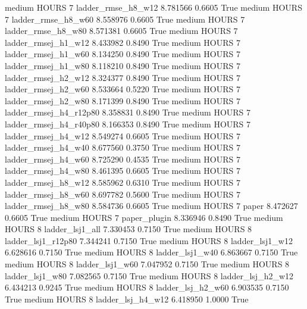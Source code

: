     medium    HOURS                 7     ladder_rmse_h8_w12   8.781566      0.6605    True
    medium    HOURS                 7     ladder_rmse_h8_w60   8.558976      0.6605    True
    medium    HOURS                 7     ladder_rmse_h8_w80   8.571381      0.6605    True
    medium    HOURS                 7    ladder_rmsej_h1_w12   8.433982      0.8490    True
    medium    HOURS                 7    ladder_rmsej_h1_w60   8.134250      0.8490    True
    medium    HOURS                 7    ladder_rmsej_h1_w80   8.118210      0.8490    True
    medium    HOURS                 7    ladder_rmsej_h2_w12   8.324377      0.8490    True
    medium    HOURS                 7    ladder_rmsej_h2_w60   8.533664      0.5220    True
    medium    HOURS                 7    ladder_rmsej_h2_w80   8.171399      0.8490    True
    medium    HOURS                 7 ladder_rmsej_h4_r12p80   8.358831      0.8490    True
    medium    HOURS                 7 ladder_rmsej_h4_r40p80   8.166353      0.8490    True
    medium    HOURS                 7    ladder_rmsej_h4_w12   8.549274      0.6605    True
    medium    HOURS                 7    ladder_rmsej_h4_w40   8.677560      0.3750    True
    medium    HOURS                 7    ladder_rmsej_h4_w60   8.725290      0.4535    True
    medium    HOURS                 7    ladder_rmsej_h4_w80   8.461395      0.6605    True
    medium    HOURS                 7    ladder_rmsej_h8_w12   8.585962      0.6310    True
    medium    HOURS                 7    ladder_rmsej_h8_w60   8.697782      0.5600    True
    medium    HOURS                 7    ladder_rmsej_h8_w80   8.584736      0.6605    True
    medium    HOURS                 7                  paper   8.472627      0.6605    True
    medium    HOURS                 7           paper_plugin   8.336946      0.8490    True
    medium    HOURS                 8        ladder_lsj1_all   7.330453      0.7150    True
    medium    HOURS                 8     ladder_lsj1_r12p80   7.344241      0.7150    True
    medium    HOURS                 8        ladder_lsj1_w12   6.628616      0.7150    True
    medium    HOURS                 8        ladder_lsj1_w40   6.863667      0.7150    True
    medium    HOURS                 8        ladder_lsj1_w60   7.047952      0.7150    True
    medium    HOURS                 8        ladder_lsj1_w80   7.082565      0.7150    True
    medium    HOURS                 8      ladder_lsj_h2_w12   6.434213      0.9245    True
    medium    HOURS                 8      ladder_lsj_h2_w60   6.903535      0.7150    True
    medium    HOURS                 8      ladder_lsj_h4_w12   6.418950      1.0000    True
